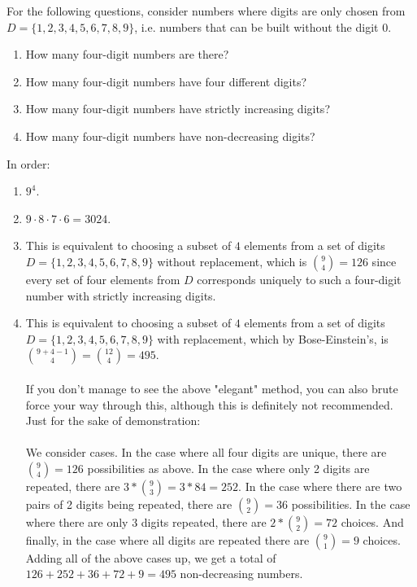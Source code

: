 \documentclass[11pt]{article}
\begin{document}
\begin{exercise}
For the following questions, consider numbers where digits are only chosen from $D = \{1,2,3,4,5,6,7,8,9\}$, i.e. numbers that can be built without the digit $0$.

\begin{enumerate}
\item How many four-digit numbers are there?

\item How many four-digit numbers have four different digits?

\item How many four-digit numbers have strictly increasing digits?

\item How many four-digit numbers have non-decreasing digits?

\end{enumerate}

\end{exercise}
\begin{solution}
In order:

\begin{enumerate}
\item $9^4$.

\item $9 \cdot 8 \cdot 7 \cdot 6 = 3024$.

\item This is equivalent to choosing a subset of $4$ elements from a set of digits $D = \{1,2,3,4,5,6,7,8,9\}$ without replacement, which is $\binom{9}{4} = 126$ since every set of four elements from $D$ corresponds uniquely to such a four-digit number with strictly increasing digits.

\item This is equivalent to choosing a subset of $4$ elements from a set of digits $D = \{1,2,3,4,5,6,7,8,9\}$ with replacement, which by Bose-Einstein's, is $\binom{9+4-1}{4} = \binom{12}{4} = 495$.\\
\\
If you don't manage to see the above "elegant" method, you can also brute force your way through this, although this is definitely not recommended. Just for the sake of demonstration:\\
\\
We consider cases. In the case where all four digits are unique, there are $\binom{9}{4} = 126$ possibilities as above. In the case where only 2 digits are repeated, there are $3 * \binom{9}{3} = 3 * 84 = 252$. In the case where there are two pairs of 2 digits being repeated, there are $\binom{9}{2} = 36$ possibilities. In the case where there are only 3 digits repeated, there are $2 * \binom{9}{2} = 72$ choices. And finally, in the case where all digits are repeated there are $\binom{9}{1} = 9$ choices. Adding all of the above cases up, we get a total of $126 + 252 + 36 + 72 + 9 = 495$ non-decreasing numbers.
\end{enumerate}
\end{solution}
\end{document}
